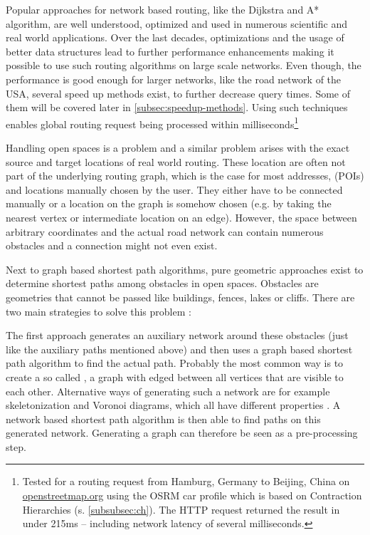 	Popular approaches for network based routing, like the Dijkstra and A* algorithm, are well understood, optimized and used in numerous scientific and real world applications.
	Over the last decades, optimizations and the usage of better data structures lead to further performance enhancements making it possible to use such routing algorithms on large scale networks.
	Even though, the performance is good enough for larger networks, like the road network of the USA\cite[5]{aviram-optimizing-dijkstra}, several speed up methods exist, to further decrease query times.
	Some of them will be covered later in \cref{subsec:speedup-methods}.
	Using such techniques enables global routing request being processed within milliseconds\footnote{Tested for a routing request from Hamburg, Germany to Beijing, China on \href{https://www.openstreetmap.org/directions?engine=fossgis\_osrm\_car&route=53.55\%2C10.00\%3B39.91\%2C116.39}{openstreetmap.org} using the OSRM car profile which is based on Contraction Hierarchies (s. \cref{subsubsec:ch}). The HTTP request returned the result in under 215ms -- including network latency of several milliseconds.}
	
	Handling open spaces is a problem and a similar problem arises with the exact source and target locations of real world routing.
	These location are often not part of the underlying routing graph, which is the case for most addresses,  (POIs) and locations manually chosen by the user.
	They either have to be connected manually or a location on the graph is somehow chosen (e.g. by taking the nearest vertex or intermediate location on an edge).
	However, the space between arbitrary coordinates and the actual road network can contain numerous obstacles and a connection might not even exist.
	
	Next to graph based shortest path algorithms, pure geometric approaches exist to determine shortest paths among obstacles in open spaces.
	Obstacles are geometries that cannot be passed like buildings, fences, lakes or cliffs.
	There are two main strategies to solve this problem \cite[2]{hershberger-suri}:
	
	The first approach generates an auxiliary network around these obstacles (just like the auxiliary paths mentioned above) and then uses a graph based shortest path algorithm to find the actual path.
	Probably the most common way is to create a so called , a graph with edged between all vertices that are visible to each other.
	Alternative ways of generating such a network are for example skeletonization and Voronoi diagrams, which all have different properties \cite[3-4]{graser-osm-open-spaces}.
	A network based shortest path algorithm is then able to find paths on this generated network\cite[2]{hershberger-suri}.
	Generating a graph can therefore be seen as a pre-processing step.
	
